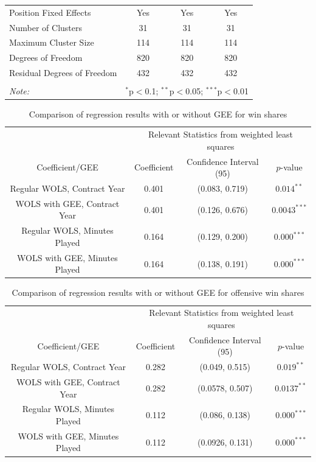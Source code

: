 \documentclass[12pt]{article}
\begin{document}
\begin{landscape}
\begin{table}[!htbp]
\begin{tabular}{@{\extracolsep{5pt}}lccc}
				Position Fixed Effects & Yes & Yes & Yes \\ 
				Number of Clusters & 31 & 31 & 31 \\ 
				Maximum Cluster Size & 114 & 114 & 114 \\ 
				Degrees of Freedom & 820 & 820 & 820 \\ 
				Residual Degrees of Freedom & 432 & 432 & 432 \\ 
				\hline 
				\hline \\[-1.8ex] 
				\textit{Note:}  & \multicolumn{3}{r}{$^{*}$p$<$0.1; $^{**}$p$<$0.05; $^{***}$p$<$0.01} \\ 
			\end{tabular} 
		\end{table}
	\end{landscape}
	
	\begin{table}[!htbp]
		\centering
		\caption{Comparison of regression results with or without GEE for win shares}
		\label{geelmcomparison} 
		\begin{tabular}{*4c}
			\toprule
			& \multicolumn{3}{c}{Relevant Statistics from weighted least squares} \\
			\cmidrule(lr){2-4}
			Coefficient/GEE & Coefficient  & Confidence Interval (95) & $p$-value \\
			\midrule
			Regular WOLS, Contract Year & 0.401       & (0.083, 0.719) & $0.014^{**}$       \\
			WOLS with GEE, Contract Year & 0.401      & (0.126, 0.676)       & $0.0043^{***}$ \\
			Regular WOLS, Minutes Played & 0.164       & (0.129, 0.200) & $0.000^{***}$ \\
			WOLS with GEE, Minutes Played & 0.164 & (0.138, 0.191)       & $0.000^{***}$       \\
			\bottomrule
		\end{tabular}
	\end{table}
	
	\begin{table}[!htbp]
		\centering
		\caption{Comparison of regression results with or without GEE for offensive win shares}
		\label{geelmcomparisonw} 
		\begin{tabular}{*4c}
			\toprule
			& \multicolumn{3}{c}{Relevant Statistics from weighted least squares} \\
			\cmidrule(lr){2-4}
			Coefficient/GEE & Coefficient  & Confidence Interval (95) & $p$-value \\
			\midrule
			Regular WOLS, Contract Year & 0.282       & (0.049, 0.515) & $0.019^{**}$       \\
			WOLS with GEE, Contract Year & 0.282      & (0.0578, 0.507)       & $0.0137^{**}$ \\
			Regular WOLS, Minutes Played & 0.112       & (0.086, 0.138) & $0.000^{***}$ \\
			WOLS with GEE, Minutes Played & 0.112 & (0.0926, 0.131)       & $0.000^{***}$       \\
			\bottomrule
		\end{tabular}
	\end{table}
	
\end{document}
